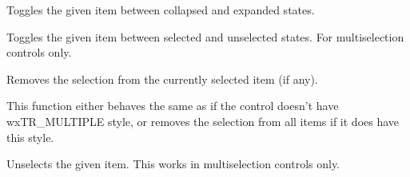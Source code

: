 \label{wxtreectrltoggle}


Toggles the given item between collapsed and expanded states.


\label{wxtreectrltoggleitemselection}


Toggles the given item between selected and unselected states. For
multiselection controls only.


\label{wxtreectrlunselect}


Removes the selection from the currently selected item (if any).


\label{wxtreectrlunselectall}


This function either behaves the same as 
if the control doesn't have wxTR\_MULTIPLE style, or removes the selection from
all items if it does have this style.


\label{wxtreectrlunselectitem}


Unselects the given item. This works in multiselection controls only.
